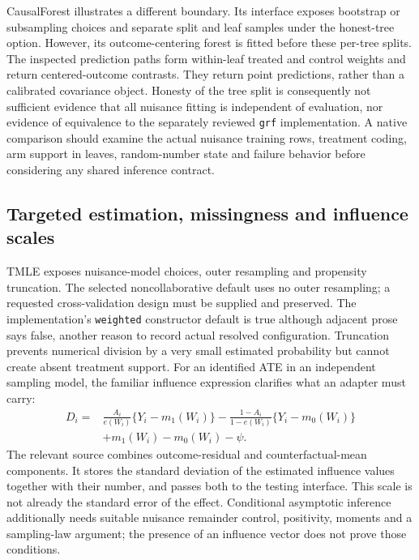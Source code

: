 CausalForest illustrates a different boundary. Its interface exposes
bootstrap or subsampling choices and separate split and leaf samples under
the honest-tree option. However, its outcome-centering forest is fitted
before these per-tree splits. The inspected prediction paths form
within-leaf treated and control weights and return centered-outcome
contrasts. They return point predictions, rather than a calibrated covariance
object. Honesty of the tree split is consequently not sufficient evidence
that all nuisance fitting is independent of evaluation, nor evidence of
equivalence to the separately reviewed \texttt{grf} implementation. A native
comparison should examine the actual nuisance training rows, treatment
coding, arm support in leaves, random-number state and failure behavior
before considering any shared inference contract.
\cite{exec21_effects_causalforest}

\subsection{Targeted estimation, missingness and influence scales}
\label{exec21:effects-tmle}

TMLE exposes nuisance-model choices, outer resampling and propensity
truncation. The selected noncollaborative default uses no outer resampling;
a requested cross-validation design must be supplied and preserved. The
implementation's \texttt{weighted} constructor default is true although
adjacent prose says false, another reason to record actual resolved
configuration. Truncation prevents numerical division by a very small
estimated probability but cannot create absent treatment support. For an
identified ATE in an independent sampling model, the familiar influence
expression clarifies what an adapter must carry:
\begin{equation}
\label{exec21:effects-influence}
\begin{aligned}
 D_i={}&\frac{A_i}{e(W_i)}\{Y_i-m_1(W_i)\}
       -\frac{1-A_i}{1-e(W_i)}\{Y_i-m_0(W_i)\}\\
       &+m_1(W_i)-m_0(W_i)-\psi .
\end{aligned}
\end{equation}
The relevant source combines outcome-residual and counterfactual-mean
components. It stores the standard deviation of the estimated influence
values together with their number, and passes both to the testing
interface. This scale is not already the standard error of the effect.
Conditional asymptotic inference additionally needs suitable nuisance
remainder control, positivity, moments and a sampling-law argument; the
presence of an influence vector does not prove those conditions.
\cite{exec21_effects_tmle}

